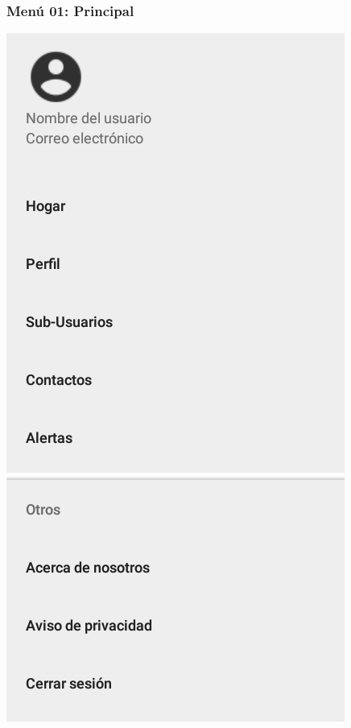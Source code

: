 \subsubsection{Menú 01: Principal} \label{mn01}
 \begin{center}
   \includegraphics[scale=.25]{Capitulo3/img/menu/MN_01_(1).png} \\
   \includegraphics[scale=.25]{Capitulo3/img/menu/MN_01_(2).png}
   \label{fig:mn01_fig}
 \end{center}

